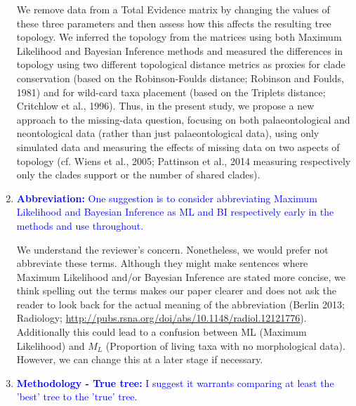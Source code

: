 \documentclass[12pt,letterpaper]{article}
\begin{document}
\begin{enumerate}
We remove data from a Total Evidence matrix by changing the values of these three parameters and then assess how this affects the resulting tree topology.
We inferred the topology from the matrices using both Maximum Likelihood and Bayesian Inference methods and measured the differences in topology using two different topological distance metrics as proxies for clade conservation (based on the Robinson-Foulds distance; Robinson and Foulds, 1981) and for wild-card taxa placement (based on the Triplets distance; Critchlow et al., 1996).
Thus, in the present study, we propose a new approach to the missing-data question, focusing on both palaeontological and neontological data (rather than just palaeontological data), using only simulated data and measuring the effects of missing data on two aspects of topology (cf. Wiens et al., 2005; Pattinson et al., 2014 measuring respectively only the clades support or the number of shared clades).

\item{\textcolor{blue}{\textbf{Abbreviation:} One suggestion is to consider abbreviating Maximum Likelihood and Bayesian Inference as ML and BI respectively early in the methods and use throughout.}}

We understand the reviewer's concern.
Nonetheless, we would prefer not abbreviate these terms. 
Although they might make sentences where Maximum Likelihood and/or Bayesian Inference are stated more concise, we think spelling out the terms makes our paper clearer and does not ask the reader to look back for the actual meaning of the abbreviation (Berlin 2013; Radiology; \url{http://pubs.rsna.org/doi/abs/10.1148/radiol.12121776}).
Additionally this could lead to a confusion between ML (Maximum Likelihood) and $M_L$ (Proportion of living taxa with no morphological data).
However, we can change this at a later stage if necessary.


\item{\textcolor{blue}{\textbf{Methodology - True tree:} I suggest it warrants comparing at least the 'best' tree to the 'true' tree.}}


\end{enumerate}
\end{document}
